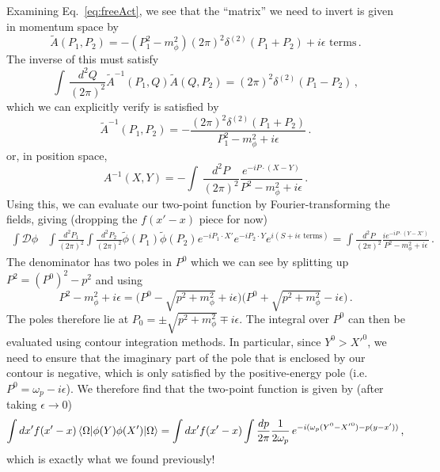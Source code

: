 \documentclass{article}
\numberwithin{equation}{subsection}
\begin{document}
Examining Eq.~\eqref{eq:freeAct}, we see that the ``matrix'' we need to invert is given in momentum space by
\begin{equation}
    \tilde{A}(P_1, P_2) = -(P_1^2 - m_\phi^2)(2\pi)^2\delta^{(2)}(P_1 + P_2) + i\epsilon\text{ terms}\,.
\end{equation}
The inverse of this must satisfy
\begin{equation}
    \int\,\frac{d^2Q}{(2\pi)^2}\tilde{A}^{-1}(P_1,Q)\tilde{A}(Q,P_2) = (2\pi)^2\delta^{(2)}(P_1 - P_2)\,,
\end{equation}
which we can explicitly verify is satisfied by
\begin{equation}\label{eq:momProp}
    \tilde{A}^{-1}(P_1, P_2) = -\frac{(2\pi)^2\delta^{(2)}(P_1 + P_2)}{P_1^2 - m_\phi^2 + i\epsilon}\,.
\end{equation}
or, in position space,
\begin{equation}
    A^{-1}(X, Y) = -\int\,\frac{d^2P}{(2\pi)^2}\frac{e^{-iP\cdot (X - Y)}}{P^2 - m_\phi^2 + i\epsilon}\,.
\end{equation}
Using this, we can evaluate our two-point function by Fourier-transforming the fields, giving (dropping the $f(x' - x)$ piece for now)
\begin{equation}\begin{split}
    \int \mathcal{D}\phi& \int\frac{d^2P_1}{(2\pi)^2}\int\frac{d^2P_2}{(2\pi)^2}\tilde{\phi}(P_1)\tilde{\phi}(P_2)e^{-iP_1\cdot X'}e^{-iP_2\cdot Y} e^{i(S + i\epsilon\text{ terms})}
	=\int \frac{d^2P}{(2\pi)^2}\frac{ie^{-iP\cdot(Y - X')}}{P^2 - m_\phi^2 + i\epsilon}\,.
\end{split}\end{equation}
The denominator has two poles in $P^0$ which we can see by splitting up $P^2 = (P^0)^2 - p^2$ and using
\begin{equation}
    P^2 - m_\phi^2 + i\epsilon = \big(P^0 - \sqrt{p^2 + m_\phi^2} + i\epsilon\big)\big(P^0 + \sqrt{p^2 + m_\phi^2} - i\epsilon\big)\,.
\end{equation}
The poles therefore lie at $P_0 = \pm \sqrt{p^2 + m_\phi^2}\mp i\epsilon$. The integral over $P^0$ can then be evaluated using contour integration methods. In particular, 
since $Y^0 > {X'}^0$, we need to ensure that the imaginary part of the pole that is enclosed by our contour is negative, which is only satisfied by the positive-energy pole 
(i.e. $P^0 = \omega_p - i\epsilon$). We therefore find that the two-point function is given by (after taking $\epsilon\to 0$)
\begin{equation}
    \int dx'f(x' - x)\mel{\Omega}{\phi(Y)\phi(X')}{\Omega} = \int dx' f(x' - x)\int\frac{dp}{2\pi}\frac{1}{2\omega_p}\,e^{-i(\omega_p(Y^0 - {X'}^0) - p(y - x'))}\,,
\end{equation}
which is exactly what we found previously!
\end{document}
